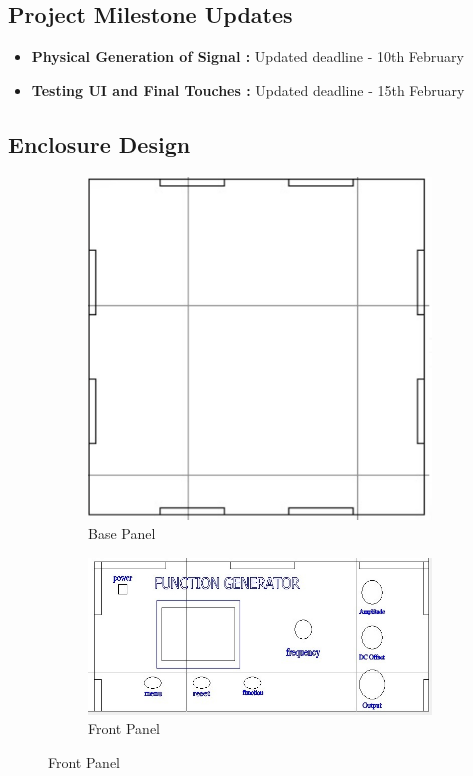 \documentclass[12pt,a4paper]{article}
\begin{document}
\subsection{Project Milestone Updates}
\begin{itemize}
    \item \textbf{Physical Generation of Signal : } Updated deadline - 10th February
    \item \textbf{Testing UI and Final Touches : } Updated deadline - 15th February
\end{itemize}
\subsection{Enclosure Design}
\begin{figure}[H]
    \centering
    \begin{subfigure}{0.48\textwidth} %
        \centering
        \includegraphics[width=\textwidth]{Design_Cycle_2.1.png} %
        \caption{Base Panel}
        \label{fig:Base Panel}
    \end{subfigure}
    \hfill
    \begin{subfigure}{0.48\textwidth} %
        \centering
        \includegraphics[width=\textwidth]{Design_Cycle_2.2.jpeg} %
        \caption{Front Panel}
        \label{fig:Front Panel}
    \end{subfigure}
    

\end{figure}
\end{document}
